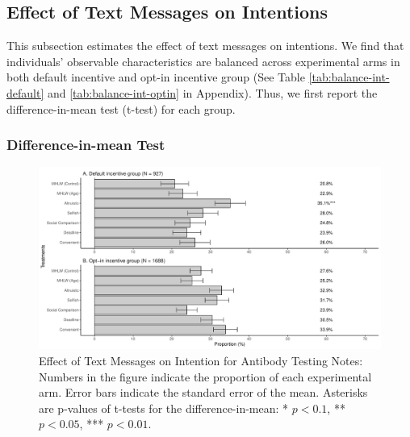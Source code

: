 \documentclass[
]{article}
\begin{document}
\hypertarget{intention}{%
\subsection{Effect of Text Messages on Intentions}\label{intention}}

This subsection estimates the effect of text messages on intentions. We find that individuals' observable characteristics are balanced across experimental arms in both default incentive and opt-in incentive group (See Table \ref{tab:balance-int-default} and \ref{tab:balance-int-optin} in Appendix). Thus, we first report the difference-in-mean test (t-test) for each group.

\hypertarget{difference-in-mean-test}{%
\subsubsection{Difference-in-mean Test}\label{difference-in-mean-test}}

\begin{figure}[t]
\includegraphics{discussion-paper_files/figure-latex/ttest-int-test-1} \caption{Effect of Text Messages on Intention for Antibody Testing Notes: Numbers in the figure indicate the proportion of each experimental arm. Error bars indicate the standard error of the mean. Asterisks are p-values of t-tests for the difference-in-mean: * $p < 0.1$, ** $p < 0.05$, *** $p < 0.01$.}\label{fig:ttest-int-test}
\end{figure}
\end{document}
